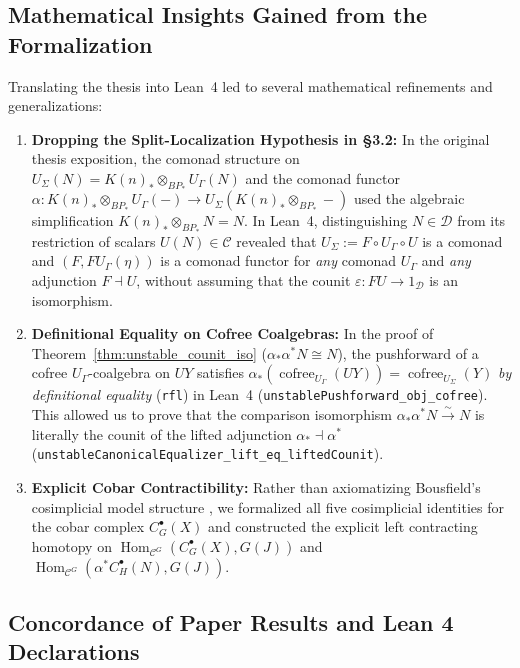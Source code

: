 \documentclass[11pt,reqno]{amsart}
\theoremstyle{plain}
\theoremstyle{definition}
\newcommand{\Hom}{\operatorname{Hom}}
\newcommand{\cofree}{\operatorname{cofree}}
\begin{document}
\subsection{Mathematical Insights Gained from the Formalization}

Translating the thesis into Lean~4 led to several mathematical refinements and generalizations:
\begin{enumerate}
  \item \textbf{Dropping the Split-Localization Hypothesis in \S3.2:} In the original thesis exposition, the comonad structure on $U_{\Sigma}(N) = K(n)_* \otimes_{BP_*} U_{\Gamma}(N)$ and the comonad functor $\alpha : K(n)_* \otimes_{BP_*} U_{\Gamma}(-) \to U_{\Sigma}(K(n)_* \otimes_{BP_*} -)$ used the algebraic simplification $K(n)_* \otimes_{BP_*} N = N$. In Lean~4, distinguishing $N \in \mathcal{D}$ from its restriction of scalars $U(N) \in \mathcal{C}$ revealed that $U_{\Sigma} := F \circ U_{\Gamma} \circ U$ is a comonad and $(F, F U_{\Gamma}(\eta))$ is a comonad functor for \emph{any} comonad $U_{\Gamma}$ and \emph{any} adjunction $F \dashv U$, without assuming that the counit $\varepsilon : FU \to 1_{\mathcal{D}}$ is an isomorphism.
  \item \textbf{Definitional Equality on Cofree Coalgebras:} In the proof of Theorem~\ref{thm:unstable_counit_iso} ($\alpha_*\alpha^* N \cong N$), the pushforward of a cofree $U_{\Gamma}$-coalgebra on $UY$ satisfies $\alpha_*(\cofree_{U_{\Gamma}}(UY)) = \cofree_{U_{\Sigma}}(Y)$ \emph{by definitional equality} (\texttt{rfl}) in Lean~4 (\texttt{unstablePushforward\_obj\_cofree}). This allowed us to prove that the comparison isomorphism $\alpha_*\alpha^* N \xrightarrow{\sim} N$ is literally the counit of the lifted adjunction $\alpha_* \dashv \alpha^*$ (\texttt{unstableCanonicalEqualizer\_lift\_eq\_liftedCounit}).
  \item \textbf{Explicit Cobar Contractibility:} Rather than axiomatizing Bousfield's cosimplicial model structure \cite{bousfield}, we formalized all five cosimplicial identities for the cobar complex $C^{\bullet}_G(X)$ and constructed the explicit left contracting homotopy on $\Hom_{\mathcal{C}^G}(C^{\bullet}_G(X), G(J))$ and $\Hom_{\mathcal{C}^G}(\alpha^* C^{\bullet}_H(N), G(J))$.
\end{enumerate}

\subsection{Concordance of Paper Results and Lean 4 Declarations}
\end{document}
